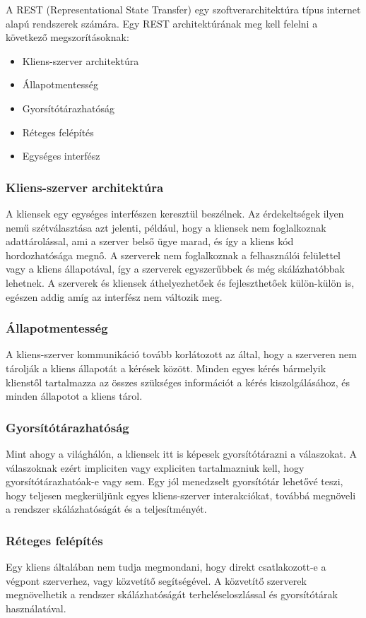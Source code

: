 A REST (Representational State Transfer) \cite{Wikipedia-REST} egy szoftverarchitektúra típus internet alapú rendszerek számára.
Egy REST architektúrának meg kell felelni a következő megszorításoknak:
\begin{itemize}
    \item Kliens-szerver architektúra
    \item Állapotmentesség
    \item Gyorsítótárazhatóság
    \item Réteges felépítés
    \item Egységes interfész
\end{itemize}

\subsubsection{Kliens-szerver architektúra}
A kliensek egy egységes interfészen keresztül beszélnek.
Az érdekeltségek ilyen nemű szétválasztása azt jelenti, például, hogy a kliensek nem foglalkoznak adattárolással, ami a szerver belső ügye marad, és így a kliens kód hordozhatósága megnő.
A szerverek nem foglalkoznak a felhasználói felülettel vagy a kliens állapotával, így a szerverek egyszerűbbek és még skálázhatóbbak lehetnek.
A szerverek és kliensek áthelyezhetőek és fejleszthetőek külön-külön is, egészen addig amíg az interfész nem változik meg.
\subsubsection{Állapotmentesség}
A kliens-szerver kommunikáció tovább korlátozott az által, hogy a szerveren nem tárolják a kliens állapotát a kérések között.
Minden egyes kérés bármelyik klienstől tartalmazza az összes szükséges információt a kérés kiszolgálásához, és minden állapotot a kliens tárol.
\subsubsection{Gyorsítótárazhatóság}
Mint ahogy a világhálón, a kliensek itt is képesek gyorsítótárazni a válaszokat.
A válaszoknak ezért impliciten vagy expliciten tartalmazniuk kell, hogy gyorsítótárazhatóak-e vagy sem.
Egy jól menedzselt gyorsítótár lehetővé teszi, hogy teljesen megkerüljünk egyes kliens-szerver interakciókat, továbbá megnöveli a rendszer skálázhatóságát és a teljesítményét.
\subsubsection{Réteges felépítés}
Egy kliens általában nem tudja megmondani, hogy direkt csatlakozott-e a végpont szerverhez, vagy közvetítő segítségével.
A közvetítő szerverek megnövelhetik a rendszer skálázhatóságát terheléseloszlással és gyorsítótárak használatával.
